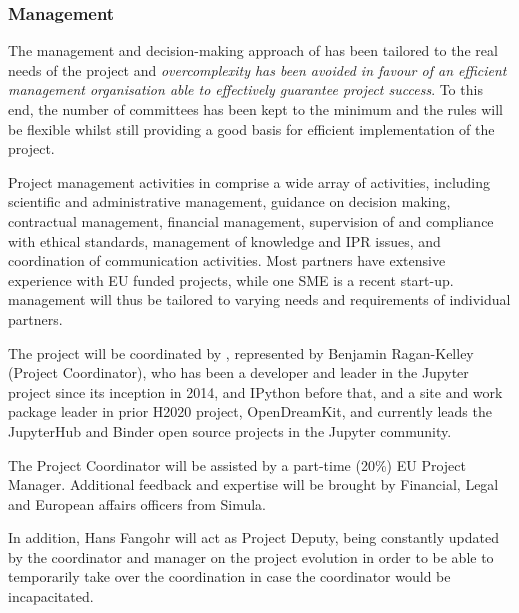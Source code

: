 

\label{sect:mgt}
\subsubsection{Management}


The management and decision-making approach of \TheProject has been
tailored to the real needs of the project and \emph{overcomplexity has been avoided
in favour of an efficient management organisation able to effectively guarantee
project success}. To this end, the number of committees has been kept to
the minimum and the rules will be flexible whilst still providing a good basis
for efficient implementation of the project.

Project management activities in \TheProject comprise a wide array
of activities, including scientific and administrative management,
guidance on decision making, contractual management, financial
management, supervision of and compliance with ethical standards,
management of knowledge and IPR issues, and coordination of
communication activities. Most partners have extensive experience
with EU funded projects, while one SME is a recent start-up.
\TheProject management will thus be tailored to varying needs and
requirements of individual partners.


The project will be coordinated by ,
represented by Benjamin Ragan-Kelley (Project Coordinator),
who has been a developer and leader in the Jupyter project since its inception in 2014,
and IPython before that,
and a site and work package leader in prior H2020 project, OpenDreamKit,
and currently leads the JupyterHub and Binder open source projects
in the Jupyter community.

The Project Coordinator will be assisted by a part-time (20\%) EU Project
Manager.
Additional feedback and expertise will be brought by Financial, Legal
and European affairs officers from Simula.

In addition, Hans Fangohr will act as Project Deputy, being constantly
updated by the coordinator and manager on the project evolution in
order to be able to temporarily take over the coordination in case the
coordinator would be incapacitated.

